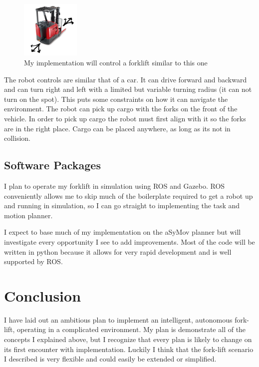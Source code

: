 \documentclass[letterpaper, 10 pt, conference]{ieeeconf}  %
\begin{document}
\begin{figure}[h]
\centering
\includegraphics[width=0.25\textwidth]{forklift}
\caption{My implementation will control a forklift similar to this one}
\label{fig:forklift}
\end{figure}

The robot controls are similar that of a car. It can drive forward and backward and can turn right and left with a limited but variable turning radius (it can not turn on the spot). This puts some constraints on how it can navigate the environment. The robot can pick up cargo with the forks on the front of the vehicle. In order to pick up cargo the robot must first align with it so the forks are in the right place. Cargo can be placed anywhere, as long as its not in collision. 


\subsection{Software Packages}

I plan to operate my forklift in simulation using ROS and Gazebo. ROS conveniently allows me to skip much of the boilerplate required to get a robot up and running in simulation, so I can go straight to implementing the task and motion planner. 

I expect to base much of my implementation on the aSyMov planner but will investigate every opportunity I see to add improvements. Most of the code will be written in python because it allows for very rapid development and is well supported by ROS.


\section{Conclusion}

I have laid out an ambitious plan to implement an intelligent, autonomous fork-lift, operating in a complicated environment. My plan is demonstrate all of the concepts I explained above, but I  recognize that every plan is likely to change on its first encounter with implementation. Luckily I think that the fork-lift scenario I described is very flexible and could easily be extended or simplified.
\end{document}
